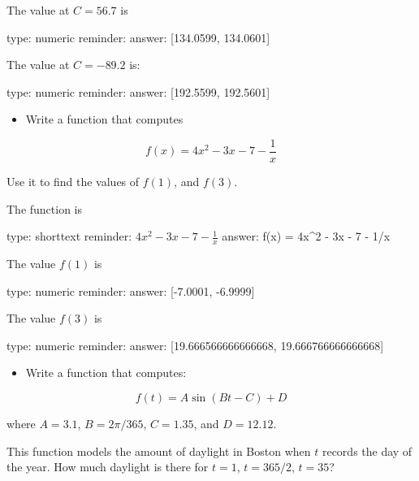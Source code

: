 \documentclass[12pt]{article}
\begin{document}
The value at $C=56.7$ is

\begin{answer}
    type: numeric
    reminder: 
    answer: [134.0599, 134.0601]

\end{answer}

The value at $C=-89.2$ is:

\begin{answer}
    type: numeric
    reminder: 
    answer: [192.5599, 192.5601]

\end{answer}

\begin{itemize}
\itemsep1pt\parskip0pt
\item
  Write a function that computes
\end{itemize}

\[
f(x) = 4x^2 - 3x  - 7 - \frac{1}{x}
\]

Use it to find the values of $f(1)$, and $f(3)$.

The function is

\begin{answer}
type: shorttext
reminder: \( 4x^2 - 3x  - 7 - \frac{1}{x} \)
answer: f(x) = 4x^2 - 3x  - 7 - 1/x

\end{answer}

The value $f(1)$ is

\begin{answer}
    type: numeric
    reminder: 
    answer: [-7.0001, -6.9999]

\end{answer}

The value $f(3)$ is

\begin{answer}
    type: numeric
    reminder: 
    answer: [19.666566666666668, 19.666766666666668]

\end{answer}

\begin{itemize}
\itemsep1pt\parskip0pt
\item
  Write a function that computes:
\end{itemize}

\[
f(t) = A\sin(Bt - C) + D
\]

where $A=3.1$, $B=2\pi/365$, $C=1.35$, and $D=12.12$.

This function models the amount of daylight in Boston when $t$ records
the day of the year. How much daylight is there for $t=1$, $t=365/2$,
$t = 35$?
\end{document}
